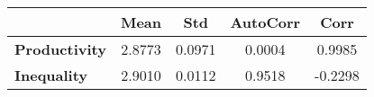 \begin{tiny}\begin{tabular}{|l|c|c|c|c|}
\hline
&\textbf{Mean}&\textbf{Std}&\textbf{AutoCorr}&\textbf{Corr}\\\hline
\textbf{Productivity}&2.8773&0.0971&0.0004&0.9985\\\hline
\textbf{Inequality}&2.9010&0.0112&0.9518&-0.2298\\\hline
\end{tabular}
\end{tiny}